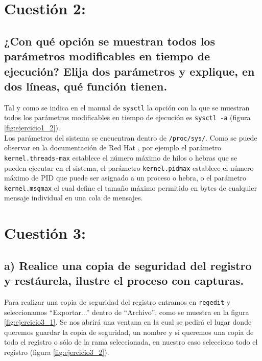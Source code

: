 \section{Cuestión 2:}

\subsection{¿Con qué opción se muestran todos los parámetros modificables en tiempo de ejecución? Elija dos parámetros y explique, en dos líneas, qué función tienen.}
Tal y como se indica en el manual de \texttt{sysctl} la opción con la que se muestran todos los parámetros modificables en tiempo de ejecución es \texttt{sysctl -a} (figura \ref{fig:ejercicio1_2}). \\

Los parámetros del sistema se encuentran dentro de \texttt{/proc/sys/}. Como se puede observar en la documentación de Red Hat \cite{ejer2}, por ejemplo el parámetro \texttt{kernel.threads-max} establece el número máximo de hilos o hebras que se pueden ejecutar en el sistema, el parámetro \texttt{kernel.pid­max} establece el número máximo de PID que puede ser asignado a un proceso o hebra, o el parámetro \texttt{kernel.msgmax} el cual define el tamaño máximo permitido en bytes de cualquier mensaje individual en una cola de mensajes.



\section{Cuestión 3:}

\subsection{a) Realice una copia de seguridad del registro y restáurela, ilustre el proceso con capturas.}

Para realizar una copia de seguridad del registro entramos en \texttt{regedit} y seleccionamos ``Exportar...'' dentro de ``Archivo'', como se muestra en la figura \ref{fig:ejercicio3_1}. Se nos abrirá una ventana en la cual se pedirá el lugar donde queremos guardar la copia de seguridad, un nombre y si queremos una copia de todo el registro o sólo de la rama seleccionada, en nuestro caso selecciono todo el registro (figura \ref{fig:ejercicio3_2}).\\

